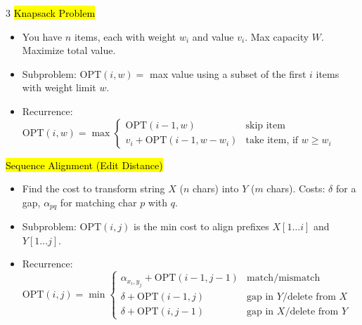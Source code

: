 \documentclass[letterpaper]{article}
\begin{document}
\begin{multicols*}{3}
    \hl{Knapsack Problem}
    \begin{itemize}
        \item You have $n$ items, each with weight $w_i$ and value $v_i$. Max capacity $W$. Maximize total value.
        \item Subproblem: $\text{OPT}(i,w) =$ max value using a subset of the first $i$ items with weight limit $w$.
        \item Recurrence:
              $
                  \text{OPT}(i,w) = \max \begin{cases}
                      \text{OPT}(i-1,w)           & \text{skip item}                \\
                      v_i + \text{OPT}(i-1,w-w_i) & \text{take item, if } w \ge w_i
                  \end{cases}
              $
    \end{itemize}

    \hl{Sequence Alignment (Edit Distance)}
    \begin{itemize}
        \item Find the cost to transform string $X$ ($n$ chars) into $Y$ ($m$ chars). Costs: $\delta$ for a gap, $\alpha_{pq}$ for matching char $p$ with $q$.
        \item Subproblem: $\text{OPT}(i,j)$ is the min cost to align prefixes $X[1 \dots i]$ and $Y[1 \dots j]$.
        \item Recurrence:
              $
                  \text{OPT}(i,j) = \min \begin{cases}
                      \alpha_{x_i,y_j} + \text{OPT}(i-1,j-1) & \text{match/mismatch}                    \\
                      \delta + \text{OPT}(i-1,j)             & \text{gap in } Y / \text{delete from } X \\
                      \delta + \text{OPT}(i,j-1)             & \text{gap in } X / \text{delete from } Y
                  \end{cases}
              $
    \end{itemize}


\end{multicols*}
\end{document}
